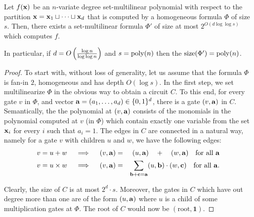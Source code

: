 \begin{lemma}\label{lem:formula set-multilinearization}
  Let $f(\mathbf{x})$ be an $n$-variate degree set-multilinear polynomial with respect to the partition $\mathbf{x} = \mathbf{x}_1\sqcup \cdots \sqcup \mathbf{x}_d$ that is computed by a homogeneous formula $\Phi$ of size $s$.
Then, there exists a set-multilinear formula $\Phi'$ of size at most $2^{O(d\log \log s)}$ which computes $f$.

In particular, if $d = O\left(\frac{\log n}{\log \log n}\right)$ and $s = \operatorname{poly}(n)$ then the $\mathrm{size}(\Phi') = \operatorname{poly}(n)$.  
\end{lemma}
\begin{proof}
To start with, without loss of generality, let us assume that the formula $\Phi$ is fan-in $2$, homogeneous and has depth $O(\log s)$.
In the first step, we set multilinearize $\Phi$ in the obvious way to obtain a circuit $C$.
To this end, for every gate $v$ in $\Phi$, and vector $\mathbf{a} = (a_1,\ldots, a_d) \in \{0,1\}^d$, there is a gate $(v, \mathbf{a})$ in $C$.
Semantically, the the polynomial at $(v,\mathbf{a})$ consists of the monomials in the polynomial computed at $v$ (in $\Phi$) which contain exactly one variable from the set $\mathbf{x}_i$ for every $i$ such that $a_i = 1$.
The edges in $C$ are connected in a natural way, namely for a gate $v$ with children $u$ and $w$, we have the following edges:
\begin{eqnarray*}
\text{$v = u + w$}\quad\implies\quad (v, \mathbf{a}) &=& (u, \mathbf{a}) \quad + \quad (w, \mathbf{a})\quad\text{for all $\mathbf{a}$}\\
\text{$v = u \times w$}\quad\implies\quad (v, \mathbf{a}) &=& \sum_{\mathbf{b} + \mathbf{c} = \mathbf{a}} (u, \mathbf{b})\cdot (w, \mathbf{c}) \quad\text{for all $\mathbf{a}$}.
\end{eqnarray*}
 
Clearly, the size of $C$ is at most $2^d\cdot s$.
Moreover, the gates in $C$ which have out degree more than one are of the form $(u,\mathbf{a})$ where $u$ is a child of some multiplication gates at $\Phi$. 
The root of $C$ would now be $(\text{root},\mathbf{1})$. 


\end{proof}
